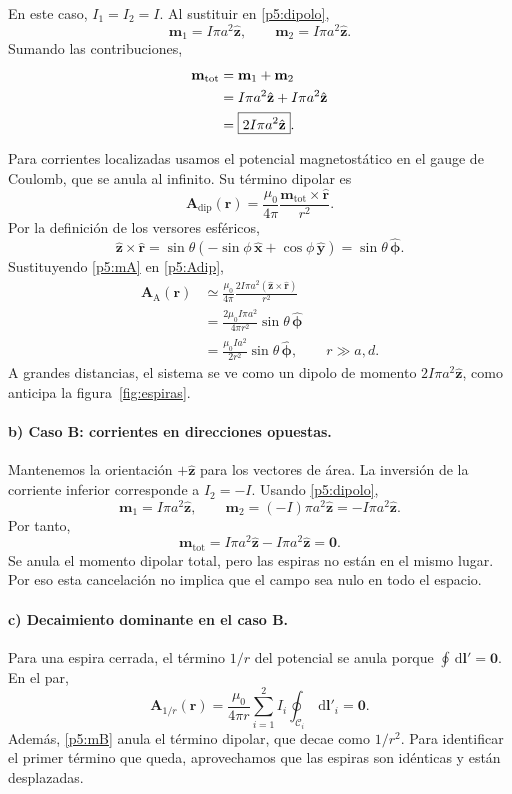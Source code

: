 \documentclass[11pt]{article}
\newcommand{\dd}{\,\mathrm{d}}
\newcommand{\ex}{\hat{\mathbf{x}}}
\newcommand{\ey}{\hat{\mathbf{y}}}
\newcommand{\ez}{\hat{\mathbf{z}}}
\newcommand{\ep}{\hat{\boldsymbol{\phi}}}
\newcommand{\er}{\hat{\mathbf r}}
\begin{document}
En este caso, $I_1=I_2=I$. Al sustituir en \eqref{p5:dipolo},
\[
  \mathbf m_1=I\pi a^2\ez,
  \qquad
  \mathbf m_2=I\pi a^2\ez.
\]
Sumando las contribuciones,
\begin{align}
  \mathbf m_{\mathrm{tot}}
    &=\mathbf m_1+\mathbf m_2
      \notag\\
    &=I\pi a^2\ez+I\pi a^2\ez
      \notag\\
    &=\boxed{2I\pi a^2\ez}.
      \label{p5:mA}
\end{align}

Para corrientes localizadas usamos el potencial magnetostático
en el gauge de Coulomb, que se anula al infinito. Su término
dipolar es
\begin{equation}
  \mathbf A_{\mathrm{dip}}(\mathbf r)
    =\frac{\mu_0}{4\pi}
      \frac{\mathbf m_{\mathrm{tot}}\times\er}{r^2}.
  \label{p5:Adip}
\end{equation}
Por la definición de los versores esféricos,
\[
  \ez\times\er
    =\sin\theta(-\sin\phi\,\ex+\cos\phi\,\ey)
    =\sin\theta\,\ep.
\]
Sustituyendo \eqref{p5:mA} en \eqref{p5:Adip},
\begin{align*}
  \mathbf A_{\mathrm A}(\mathbf r)
    &\simeq\frac{\mu_0}{4\pi}
      \frac{2I\pi a^2(\ez\times\er)}{r^2}\\
    &=\frac{2\mu_0I\pi a^2}{4\pi r^2}
      \sin\theta\,\ep\\
    &=\boxed{\frac{\mu_0Ia^2}{2r^2}\sin\theta\,\ep},
      \qquad r\gg a,d.
\end{align*}
A grandes distancias, el sistema se ve como un dipolo de momento
$2I\pi a^2\ez$, como anticipa la figura~\ref{fig:espiras}.

\paragraph{b) Caso B: corrientes en direcciones opuestas.}
Mantenemos la orientación $+\ez$ para los vectores de área.
La inversión de la corriente inferior corresponde a $I_2=-I$.
Usando \eqref{p5:dipolo},
\[
  \mathbf m_1=I\pi a^2\ez,
  \qquad
  \mathbf m_2=(-I)\pi a^2\ez=-I\pi a^2\ez.
\]
Por tanto,
\begin{equation}
  \boxed{
    \mathbf m_{\mathrm{tot}}
      =I\pi a^2\ez-I\pi a^2\ez
      =\mathbf0.
  }
  \label{p5:mB}
\end{equation}
Se anula el momento dipolar total, pero las espiras no están
en el mismo lugar. Por eso esta cancelación no implica que
el campo sea nulo en todo el espacio.

\paragraph{c) Decaimiento dominante en el caso B.}
Para una espira cerrada, el término $1/r$ del potencial se anula
porque $\oint\dd\mathbf l'=\mathbf0$. En el par,
\[
  \mathbf A_{1/r}(\mathbf r)
    =\frac{\mu_0}{4\pi r}
      \sum_{i=1}^2 I_i\oint_{\mathcal C_i}\dd\mathbf l'_i
    =\mathbf0.
\]
Además, \eqref{p5:mB} anula el término dipolar, que decae como
$1/r^2$. Para identificar el primer término que queda,
aprovechamos que las espiras son idénticas y están desplazadas.
\end{document}
